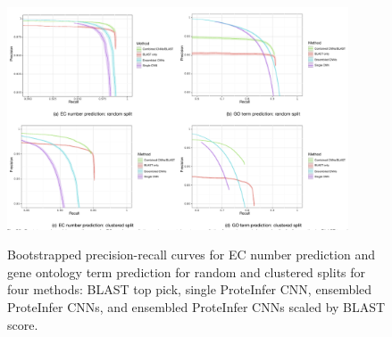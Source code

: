 \begin{figure}[ht] 
  \DIFdelbeginFL %
{%
} 
{%
} 
{%
} 
{%
} 
\DIFdelendFL \DIFaddbeginFL \includegraphics[width=0.9\textwidth]{combined_subfigs_b.pdf}
  \DIFaddendFL \caption{Bootstrapped precision-recall curves for EC number prediction and gene ontology term prediction for random and clustered splits for four methods: BLAST top pick, single ProteInfer CNN, ensembled ProteInfer CNNs, and ensembled ProteInfer CNNs scaled by BLAST score. }
  \label{fig:with_ensemble} 
\end{figure}



